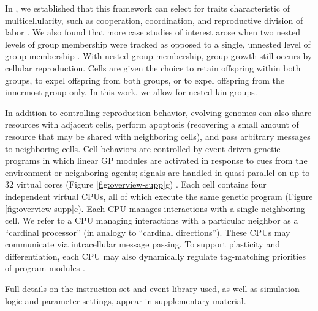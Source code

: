 
In , we established that this framework can select for traits characteristic of multicellularity, such as cooperation, coordination, and reproductive division of labor .
We also found that more case studies of interest arose when two nested levels of group membership were tracked
as opposed to a single, unnested level of group membership .
With nested group membership, group growth still occurs by cellular reproduction.
Cells are given the choice to retain offspring within both groups, to expel offspring from both groups, or to expel offspring from the innermost group only.
In this work, we allow for nested kin groups.

In addition to controlling reproduction behavior, evolving genomes can also share resources with adjacent cells, perform apoptosis (recovering a small amount of resource that may be shared with neighboring cells), and pass arbitrary messages to neighboring cells.
Cell behaviors are controlled by event-driven genetic programs in which linear GP modules are activated in response to cues from the environment or neighboring agents; signals are handled in quasi-parallel on up to 32 virtual cores (Figure \ref{fig:overview-supp}g) \citep{lalejini2018evolving}.
Each cell contains four independent virtual CPUs, all of which execute the same genetic program (Figure \ref{fig:overview-supp}e).
Each CPU manages interactions with a single neighboring cell.
We refer to a CPU managing interactions with a particular neighbor as a ``cardinal processor'' (in analogy to ``cardinal directions'').
These CPUs may communicate via intracellular message passing.
To support plasticity and differentiation, each CPU may also dynamically regulate tag-matching priorities of program modules \citep{lalejini2021tag}.

Full details on the instruction set and event library used, as well as simulation logic and parameter settings, appear in supplementary material.

